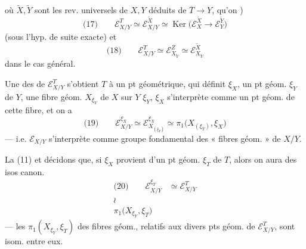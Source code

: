 \documentclass[11pt,a4paper]{article}
\begin{document}
où $\tilde{X}, \tilde{Y}$ sont les rev. universels de $X, Y$ déduits de
\struck{\ill{}} \ill{} $\overline{T} \to Y$, \ill{} qu'on )
\[
\text{(17)} \qquad \mathcal{E}^{T}_{X/Y} \simeq \mathcal{E}^{\tilde{X}}_{X/Y} \simeq \operatorname{Ker}\bigl(\mathcal{E}^{\tilde{X}}_{X} \to \mathcal{E}^{\tilde{Y}}_{Y}\bigr)
\]
(sous l'hyp. de suite exacte) et
\[
\text{(18)} \qquad \mathcal{E}^{T}_{X/Y} \simeq \mathcal{E}^{Z}_{X_{\tilde{Y}}} \simeq \mathcal{E}^{\tilde{X}}_{X_{\tilde{Y}}}
\]
dans le cas général.


Une \ill{} des \ill{} de $\mathcal{E}^{T}_{X/Y}$ s'obtient  \struck{\ill{}}
$T$  à un pt géométrique, qui définit $\xi_X$, un pt géom. $\xi_Y$ de $Y$,
une fibre géom. $X_{\xi_Y}$ de $X$ sur $Y$ \ill{} $\xi_Y$, $\xi_X$ s'interprète comme un
pt géom. de cette fibre, et on a
\[
\text{(19)} \qquad \mathcal{E}^{\xi_X}_{X/Y} \simeq \mathcal{E}^{\xi_X}_{X_{(\xi_Y)}} \simeq \pi_1\bigl(X_{(\xi_Y)}, \xi_X\bigr)
\]
--- i.e. $\mathcal{E}_{X/Y}$ s'interprète comme groupe fondamental
des « fibres géom. » de $X/Y$.

La \ill{} \ill{}   (11)
et décidons que, si $\xi_X$ provient d'un pt géom. $\xi_T$ de $T$, alors on aura
des isos canon.
\[
\begin{aligned}
\text{(20)} \qquad \mathcal{E}^{\xi_T}_{X/Y} & \simeq \mathcal{E}^{T}_{X/Y} \\
\wr\ \ & \\
\pi_1\bigl(X_{\xi_Y}, \xi_T\bigr) &
\end{aligned}
\]
\struck{\ill{}} --- les $\pi_1(X_{\xi_Y}, \xi_T)$ des fibres
géom., relatifs aux divers pts géom.
de $\mathcal{E}^{T}_{X/Y}$, sont  isom.
entre eux.
\end{document}
